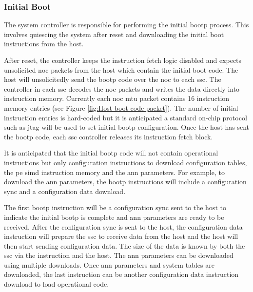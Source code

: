 \subsubsection{Initial Boot}
\label{sec:Initial Boot}

The system controller is responsible for performing the initial \ac{bootp} process.
This involves quiescing the system after reset and downloading the initial boot instructions from the host.

After reset, the controller keeps the instruction fetch logic disabled and expects unsolicited \ac{noc} packets from the host which contain the initial boot code.
The host will unsolicitedly send the \ac{bootp} code over the \ac{noc} to each \ac{ssc}.
The controller in each \ac{ssc} decodes the \ac{noc} packets and writes the data directly into instruction memory.
Currently each \ac{noc} \ac{mtu} packet contains 16 instruction memory entries (see Figure \ref{fig:Host boot code packet}).
The number of initial instruction entries is hard-coded but it is anticipated a standard on-chip protocol such as \ac{jtag} will be used to set initial \ac{bootp} configuration.
Once the host has sent the \ac{bootp} code, each \ac{ssc} controller releases its instruction fetch block.

It is anticipated that the initial \ac{bootp} code will not contain operational instructions but only configuration instructions to download configuration tables, the \ac{pe} \ac{simd} instruction memory and the \ac{ann} parameters.
For example, to download the \ac{ann} parameters, the \ac{bootp} instructions will include a configuration sync and a configuration data download.

The first \ac{bootp} instruction will be a configuration sync sent to the host to indicate the initial \ac{bootp} is complete and \ac{ann} parameters are ready to be received.
After the configuration sync is sent to the host, the configuration data instruction will prepare the \ac{ssc} to receive data from the host and the host will then start sending configuration data. 
The size of the data is known by both the \ac{ssc} via the instruction and the host.
The \ac{ann} parameters can be downloaded using multiple downloads.
Once \ac{ann} parameters and system tables are downloaded, the last instruction can be another configuration data instruction download to load operational code.

